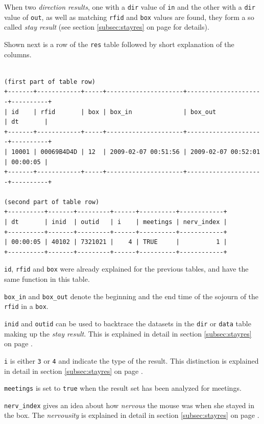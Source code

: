 When two \textit{direction results}, one with a \lstinline|dir| value of \lstinline|in| and the other with a \lstinline|dir| value of \lstinline|out|, as well as matching \lstinline|rfid| and \lstinline|box| values are found, they form a so called \textit{stay result} (see section \ref{subsec:stayres} on page \pageref{subsec:stayres} for details).

Shown next is a row of the \lstinline|res| table followed by short explanation of the columns.

\codescript
\begin{lstlisting}[frame=none]

(first part of table row)
+-------+------------+-----+---------------------+---------------------+----------+
| id    | rfid       | box | box_in              | box_out             | dt       |
+-------+------------+-----+---------------------+---------------------+----------+
| 10001 | 00069B4D4D | 12  | 2009-02-07 00:51:56 | 2009-02-07 00:52:01 | 00:00:05 |
+-------+------------+-----+---------------------+---------------------+----------+

(second part of table row)
+----------+-------+---------+------+----------+------------+
| dt       | inid  | outid   | i    | meetings | nerv_index |
+----------+-------+---------+------+----------+------------+
| 00:00:05 | 40102 | 7321021 |    4 | TRUE     |          1 | 
+----------+-------+---------+------+----------+------------+

\end{lstlisting}

\begin{mydesc}
	\item \lstinline|id|, \lstinline|rfid| and \lstinline|box| were already explained for the previous tables, and have the same function in this table.
	\item \lstinline|box_in| and \lstinline|box_out| denote the beginning and the end time of the sojourn of the \lstinline|rfid| in a \lstinline|box|.
	 \item \lstinline|inid| and \lstinline|outid| can be used to backtrace the datasets in the \lstinline|dir| or \lstinline|data| table making up the \textit{stay result}. This is explained in detail in section \ref{subsec:stayres} on page \pageref{subsec:stayres}.
	 \item \lstinline|i| is either \lstinline|3| or \lstinline|4| and indicate the type of the result. This distinction is explained in detail in section \ref{subsec:stayres} on page \pageref{subsec:stayres}.
	 \item \lstinline|meetings| is set to \lstinline|true| when the result set has been analyzed for meetings.
	 \item \lstinline|nerv_index| gives an idea about how \textit{nervous} the mouse was when she stayed in the box. The \textit{nervousity} is explained in detail in section \ref{subsec:stayres} on page \pageref{subsec:stayres}. 
\end{mydesc}

